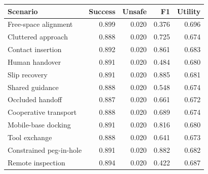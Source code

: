 \begin{tabular}{lrrrr}
\toprule
Scenario & Success & Unsafe & F1 & Utility \\
\midrule
Free-space alignment & 0.899 & 0.020 & 0.376 & 0.696 \\
Cluttered approach & 0.888 & 0.020 & 0.725 & 0.674 \\
Contact insertion & 0.892 & 0.020 & 0.861 & 0.683 \\
Human handover & 0.891 & 0.020 & 0.484 & 0.680 \\
Slip recovery & 0.891 & 0.020 & 0.885 & 0.681 \\
Shared guidance & 0.888 & 0.020 & 0.548 & 0.674 \\
Occluded handoff & 0.887 & 0.020 & 0.661 & 0.672 \\
Cooperative transport & 0.888 & 0.020 & 0.689 & 0.674 \\
Mobile-base docking & 0.891 & 0.020 & 0.816 & 0.680 \\
Tool exchange & 0.888 & 0.020 & 0.641 & 0.673 \\
Constrained peg-in-hole & 0.891 & 0.020 & 0.882 & 0.682 \\
Remote inspection & 0.894 & 0.020 & 0.422 & 0.687 \\
\bottomrule
\end{tabular}
